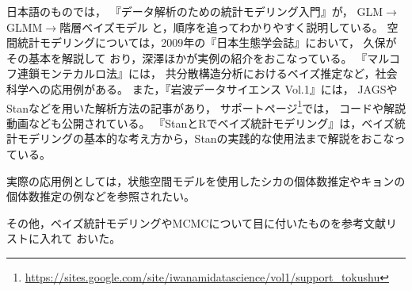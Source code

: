 \documentclass[11pt,uplatex]{jsarticle}
\begin{document}
日本語のものでは，
『データ解析のための統計モデリング入門』\cite{Kubo:Modeling}が，
GLM$\rightarrow$GLMM$\rightarrow$階層ベイズモデル
と，順序を追ってわかりやすく説明している。
空間統計モデリングについては，2009年の『日本生態学会誌』において，
久保\cite{Kubo}がその基本を解説して
おり，深澤ほか\cite{Fukasawa_et_al}が実例の紹介をおこなっている。
『マルコフ連鎖モンテカルロ法』\cite{Toyoda}には，
共分散構造分析におけるベイズ推定など，社会科学への応用例がある。
また，『岩波データサイエンス Vol.1』\cite{Iwanami_vol1}には，
\textsf{JAGS}や\textsf{Stan}などを用いた解析方法の記事があり，
サポートページ\footnote{\url{https://sites.google.com/site/iwanamidatascience/vol1/support_tokushu}}では，
コードや解説動画なども公開されている。
『StanとRでベイズ統計モデリング』\cite{Matsuura}は，ベイズ統計モデリングの基本的な考え方から，\textsf{Stan}の実践的な使用法まで解説をおこなっている。

実際の応用例としては，状態空間モデルを使用したシカの個体数推定\cite{Iijima2013}やキョンの個体数推定の例\cite{Asada:2014}などを参照されたい。

その他，ベイズ統計モデリングやMCMCについて目に付いたものを参考文献リストに入れて
おいた。

\end{document}
